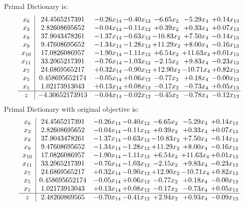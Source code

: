 \documentclass[9pt]{article}
\begin{document}
Primal Dictionary is:
\[\begin{array}{c| c c@{\hskip 2pt} c@{\hskip 2pt} c@{\hskip 2pt} c@{\hskip 2pt} c@{\hskip 2pt} }
 x_{6}   &  24.4565217391 & -0.26 x_{14} & -0.40 x_{12} & -6.65 x_{2} & -5.29 x_{4} & +  0.14 x_{13}\\
 x_{3}   &  2.82608695652 & -0.04 x_{14} & -0.11 x_{12} & +  0.39 x_{2} & +  0.33 x_{4} & +  0.07 x_{13}\\
 x_{8}   &  37.9043478261 & -1.37 x_{14} & -0.63 x_{12} & -10.83 x_{2} & +  7.50 x_{4} & -0.14 x_{13}\\
 x_{9}   &  9.47608695652 & -1.34 x_{14} & -1.28 x_{12} & + 11.29 x_{2} & +  8.00 x_{4} & -0.16 x_{13}\\
 x_{10}   &  17.0826086957 & -1.90 x_{14} & -1.11 x_{12} & +  6.54 x_{2} & + 11.63 x_{4} & +  0.01 x_{13}\\
 x_{11}   &  33.2065217391 & -0.76 x_{14} & -1.03 x_{12} & -2.15 x_{2} & +  9.83 x_{4} & -0.23 x_{13}\\
 x_{7}   &  24.6869565217 & +  0.32 x_{14} & -0.90 x_{12} & + 12.90 x_{2} & -10.71 x_{4} & +  0.82 x_{13}\\
 x_{5}   &  0.458695652174 & -0.05 x_{14} & +  0.06 x_{12} & -0.77 x_{2} & +  0.18 x_{4} & -0.00 x_{13}\\
 x_{1}   &  1.02173913043 & +  0.13 x_{14} & +  0.08 x_{12} & -0.17 x_{2} & -0.73 x_{4} & +  0.05 x_{13}\\
\hline
z    &  -4.30652173913 & -0.04 x_{14} & -0.02 x_{12} & -0.45 x_{2} & -0.78 x_{4} & -0.12 x_{13}\\
\end{array}\]
Primal Dictionary with original objective is:
\[\begin{array}{c| c c@{\hskip 2pt} c@{\hskip 2pt} c@{\hskip 2pt} c@{\hskip 2pt} c@{\hskip 2pt} }
 x_{6}   &  24.4565217391 & -0.26 x_{14} & -0.40 x_{12} & -6.65 x_{2} & -5.29 x_{4} & +  0.14 x_{13}\\
 x_{3}   &  2.82608695652 & -0.04 x_{14} & -0.11 x_{12} & +  0.39 x_{2} & +  0.33 x_{4} & +  0.07 x_{13}\\
 x_{8}   &  37.9043478261 & -1.37 x_{14} & -0.63 x_{12} & -10.83 x_{2} & +  7.50 x_{4} & -0.14 x_{13}\\
 x_{9}   &  9.47608695652 & -1.34 x_{14} & -1.28 x_{12} & + 11.29 x_{2} & +  8.00 x_{4} & -0.16 x_{13}\\
 x_{10}   &  17.0826086957 & -1.90 x_{14} & -1.11 x_{12} & +  6.54 x_{2} & + 11.63 x_{4} & +  0.01 x_{13}\\
 x_{11}   &  33.2065217391 & -0.76 x_{14} & -1.03 x_{12} & -2.15 x_{2} & +  9.83 x_{4} & -0.23 x_{13}\\
 x_{7}   &  24.6869565217 & +  0.32 x_{14} & -0.90 x_{12} & + 12.90 x_{2} & -10.71 x_{4} & +  0.82 x_{13}\\
 x_{5}   &  0.458695652174 & -0.05 x_{14} & +  0.06 x_{12} & -0.77 x_{2} & +  0.18 x_{4} & -0.00 x_{13}\\
 x_{1}   &  1.02173913043 & +  0.13 x_{14} & +  0.08 x_{12} & -0.17 x_{2} & -0.73 x_{4} & +  0.05 x_{13}\\
\hline
z    &  2.48260869565 & -0.70 x_{14} & -0.41 x_{12} & +  2.94 x_{2} & +  0.93 x_{4} & -0.09 x_{13}\\
\end{array}\]
\end{document}
